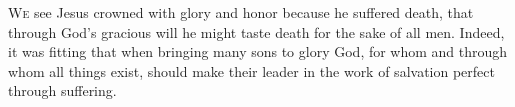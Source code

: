 \lettrine[lines=3,loversize=0.15]{W}{e} see Jesus crowned with glory and honor because he suffered death, that through God’s gracious will he might taste death for the sake of all men. Indeed, it was fitting that when bringing many sons to glory God, for whom and through whom all things exist, should make their leader in the work of salvation perfect through suffering.
